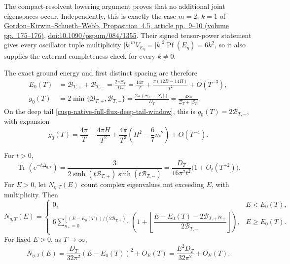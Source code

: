 The compact-resolvent lowering argument proves that no additional joint
eigenspaces occur.  Independently, this is exactly the case \(m=2\), \(k=1\)
of
\href{https://www.math.hu-berlin.de/~schueth/quantumtori.pdf}%
{Gordon--Kirwin--Schueth--Webb, Proposition~4.5, article pp.~9--10
(volume pp.~175--176)},
\href{https://doi.org/10.1090/pspum/084/1355}%
{doi:10.1090/pspum/084/1355}.  Their signed tensor-power statement gives
every oscillator tuple multiplicity
\(|k|^mV_{E_\eta}=|k|^2\operatorname{Pf}(E_\eta)=6k^2\), so it also supplies
the external completeness check for every \(k\ne0\).

The exact ground energy and first distinct spacing are therefore
\begin{align}
 E_0(T)&=\mathcal B_{T,+}+\mathcal B_{T,-}
 =\frac{2\pi\Xi_T}{D_T}
 =\frac{14\pi}{T}+\frac{\pi(12B-14H)}{T^2}+O(T^{-3}),
 \label{cusp-native-full-flux-ground-energy}\\
 g_0(T)&=2\min\{\mathcal B_{T,+},\mathcal B_{T,-}\}
 =\frac{2\pi(\Xi_T-|S_T|)}{D_T}
 =\frac{48\pi}{\Xi_T+|S_T|}.
 \label{cusp-native-full-flux-global-gap}
\end{align}
On the deep tail \cref{cusp-native-full-flux-deep-tail-window}, this is
\(g_0(T)=2\mathcal B_{T,-}\), with expansion
\begin{equation}
 g_0(T)=\frac{4\pi}{T}-\frac{4\pi H}{T^2}
 +\frac{4\pi}{T^3}\left(H^2-\frac67m^2\right)+O(T^{-4}).
 \label{cusp-native-full-flux-gap-expansion}
\end{equation}

\begin{corollary}
\label{cusp-native-full-flux-heat-count}
For \(t>0\),
\begin{equation}
 \operatorname{Tr}(e^{-t\Delta_{\eta,T}})
 =\frac{3}{2\sinh(t\mathcal B_{T,+})
                 \sinh(t\mathcal B_{T,-})}
 =\frac{D_T}{16\pi^2t^2}\bigl(1+O_t(T^{-2})\bigr).
 \label{cusp-native-full-flux-heat-trace}
\end{equation}
For \(E>0\), let \(N_{\eta,T}(E)\) count complex eigenvalues not exceeding
\(E\), with multiplicity.  Then
\begin{equation}
 N_{\eta,T}(E)=
 \begin{cases}
 0,&E<E_0(T),\\[1mm]
 6\displaystyle\sum_{n_+=0}^{\left\lfloor
 (E-E_0(T))/(2\mathcal B_{T,+})\right\rfloor}
 \left(1+\left\lfloor
 \dfrac{E-E_0(T)-2\mathcal B_{T,+}n_+}
       {2\mathcal B_{T,-}}
 \right\rfloor\right),&E\ge E_0(T).
 \end{cases}
 \label{cusp-native-full-flux-counting-function}
\end{equation}
For fixed \(E>0\), as \(T\to\infty\),
\begin{equation}
 N_{\eta,T}(E)
 =\frac{D_T}{32\pi^2}(E-E_0(T))^2+O_E(T)
 =\frac{E^2D_T}{32\pi^2}+O_E(T).
 \label{cusp-native-full-flux-counting-asymptotic}
\end{equation}
\end{corollary}

